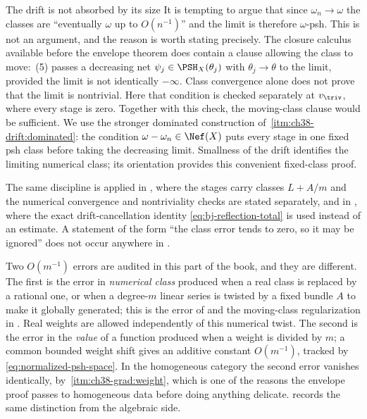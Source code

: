 \begin{warning}{The drift is not absorbed by its size}
\label{warn:ch38-drift-not-absorbed}
It is tempting to argue that since $\omega_n\to\omega$ the classes are
``eventually $\omega$ up to $O(n^{-1})$'' and the limit is therefore
$\omega$-psh.  This is not an argument, and the reason is worth stating
precisely.  The closure calculus available before the envelope theorem
does contain a clause allowing the class to move:
\,(5) passes a decreasing net
$\psi_j\in\PSH_X(\theta_j)$ with $\theta_j\to\theta$ to the limit,
provided the limit is not identically $-\infty$.  Class convergence alone does not prove that the limit is
nontrivial. Here that condition is checked separately at
$v_{\triv}$, where every stage is zero. Together with this check,
the moving-class clause would be sufficient.
We use the stronger dominated construction of
\,\cref{itm:ch38-drift:dominated}:
the condition $\omega-\omega_n\in\Nef(X)$ puts every stage in
one fixed psh class before taking the decreasing limit.
Smallness of the drift identifies the limiting numerical class;
its orientation provides this convenient fixed-class proof.

The same discipline is applied in
, where the stages carry classes
$L+A/m$ and the numerical convergence and nontriviality checks
are stated separately, and in , where the exact
drift-cancellation identity \eqref{eq:bj-reflection-total} is used instead
of an estimate.  A statement of the form ``the class error tends to zero,
so it may be ignored'' does not occur anywhere in
.
\end{warning}

\begin{remark}
\label{rem:ch38-two-errors}
Two $O(m^{-1})$ errors are audited in this part of the book, and they are
different.  The first is the error in \emph{numerical class} produced when
a real class is replaced by a rational one, or when a degree-$m$
linear series is twisted by a fixed bundle $A$ to make it globally
generated; this is the error of  and
the moving-class regularization in .
Real weights are allowed independently of this numerical twist.  The second is the error in
the \emph{value} of a function produced when a weight is divided by $m$;
a common bounded weight shift gives an additive constant
$O(m^{-1})$, tracked by \eqref{eq:normalized-psh-space}.  In the homogeneous category
the second error vanishes identically, by
\,\cref{itm:ch38-grad:weight}, which is one of
the reasons the envelope proof passes to homogeneous data before doing
anything delicate.   records the same
distinction from the algebraic side.
\end{remark}

